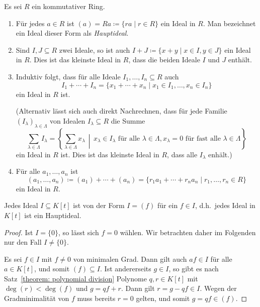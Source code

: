 \begin{example}
  Es sei $R$ ein kommutativer Ring.
  \begin{enumerate}
    \item
      Für jedes $a \in R$ ist $(a) = Ra \coloneqq \{ra \mid r \in R\}$ ein Ideal in $R$.
      Man bezeichnet ein Ideal dieser Form als \emph{Hauptideal}.
    \item
      Sind $I, J \subseteq R$ zwei Ideale, so ist auch $I + J \coloneqq \{x + y \mid x \in I, y \in J\}$ ein Ideal in $R$.
      Dies ist das kleinste Ideal in $R$, dass die beiden Ideale $I$ und $J$ enthält.
    \item
      Induktiv folgt, dass für alle Ideale $I_1, \dotsc, I_n \subseteq R$ auch
      \[
          I_1 + \dotsb + I_n
        = \{ x_1 + \dotsb + x_n \mid x_1 \in I_1, \dotsc, x_n \in I_n \}
      \]
      ein Ideal in $R$ ist.
      
      (Alternativ lässt sich auch direkt Nachrechnen, dass für jede Familie $(I_\lambda)_{\lambda \in \Lambda}$ von Idealen $I_\lambda \subseteq R$ die Summe
      \[
          \sum_{\lambda \in \Lambda} I_\lambda
        = \left\{
            \sum_{\lambda \in \Lambda} x_\lambda
          \,\middle|\,
            \text{$x_\lambda \in I_\lambda$ für alle $\lambda \in \Lambda$},
            \text{$x_\lambda = 0$ für fast alle $\lambda \in \Lambda$}
          \right\}
      \]
      ein Ideal in $R$ ist.
      Dies ist das kleinste Ideal in $R$, dass alle $I_\lambda$ enhält.)
    \item
      Für alle $a_1, \dotsc, a_n$ ist
      \[
                  (a_1, \dotsc, a_n)
        \coloneqq (a_1) + \dotsb + (a_n)
        =         \{ r_1 a_1 + \dotsb + r_n a_n \mid r_1, \dotsc, r_n \in R \}
      \]
      ein Ideal in $R$.
  \end{enumerate}
\end{example}

\begin{proposition}
  \label{proposition: the polynomial ring is a principal ideal domain}
  Jedes Ideal $I \subseteq K[t]$ ist von der Form $I = (f)$ für ein $f \in I$, d.h.\ jedes Ideal in $K[t]$ ist ein Hauptideal.
\end{proposition}

\begin{proof}
  Ist $I = \{0\}$, so lässt sich $f = 0$ wählen.
  Wir betrachten daher im Folgenden nur den Fall $I \neq \{0\}$.
  
  Es sei $f \in I$ mit $f \neq 0$ von minimalen Grad.
  Dann gilt auch $af \in I$ für alle $a \in K[t]$, und somit $(f) \subseteq I$.
  Ist andererseits $g \in I$, so gibt es nach Satz~\ref{theorem: polynomial division} Polynome $q, r \in K[t]$ mit $\deg(r) < \deg(f)$ und $g = q f + r$.
  Dann gilt $r = g - qf \in I$.
  Wegen der Gradminimalität von $f$ muss bereits $r = 0$ gelten, und somit $g = q f \in (f)$.
\end{proof}


